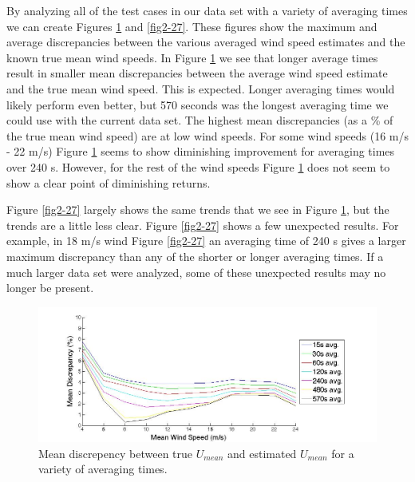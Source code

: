 By analyzing all of the test cases in our data set with a variety of averaging times we can create Figures \ref{fig2-26} and \ref{fig2-27}. These figures show the maximum and average discrepancies between the various averaged wind speed estimates and the known true mean wind speeds. In Figure \ref{fig2-26} we see that longer average times result in smaller mean discrepancies between the average wind speed estimate and the true mean wind speed. This is expected. Longer averaging times would likely perform even better, but 570 seconds was the longest averaging time we could use with the current data set. The highest mean discrepancies (as a \% of the true mean wind speed) are at low wind speeds. For some wind speeds (16 m/s - 22 m/s) Figure \ref{fig2-26} seems to show diminishing improvement for averaging times over 240 s. However, for the rest of the wind speeds Figure \ref{fig2-26} does not seem to show a clear point of diminishing returns.

Figure \ref{fig2-27} largely shows the same trends that we see in Figure \ref{fig2-26}, but the trends are a little less clear. Figure \ref{fig2-27} shows a few unexpected results. For example, in 18 m/s wind Figure \ref{fig2-27} an averaging time of 240 s gives a larger maximum discrepancy than any of the shorter or longer averaging times. If a much larger data set were analyzed, some of these unexpected results may no longer be present.



\begin{figure}[ht]
	\centering
		\includegraphics[width = \linewidth]{Figures/ch2Figures/fig2-26.jpg}
		
	\caption{Mean discrepency between true $U_{mean}$ and estimated $U_{mean}$ for a variety of averaging times.}
	\label{fig2-26}
\end{figure}

